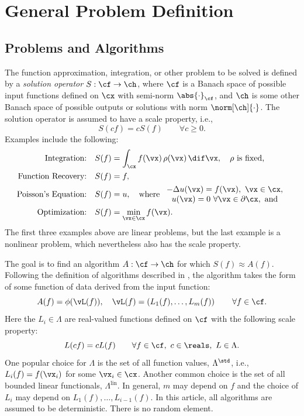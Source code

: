 \documentclass[]{elsarticle}
\DeclareMathOperator{\lin}{lin}
\theoremstyle{definition}
\theoremstyle{remark}
\newcommand{\Fnorm}[1]{\abs{#1}_{\cf}}
\begin{document}
\section{General Problem Definition} \label{probdefsec}

\subsection{Problems and Algorithms} The function approximation, integration, or other problem to be solved is defined by a \emph{solution operator} $S:\cf \to \ch$, where $\cf$ is a Banach space of possible input functions defined on $\cx$ with semi-norm $\Fnorm{\cdot}$, and $\ch$ is some other Banach space of possible outputs or solutions with norm $\norm[\ch]{\cdot}$. The solution operator is assumed to have a scale property, i.e., 
\[
S(cf) = cS(f) \qquad \forall c\ge 0.
\]
Examples include the following:
\begin{align*}
\text{Integration:} \quad & S(f) = \int_{\cx} f(\vx) \, \rho(\vx) \, \dif \vx, \quad \rho \text{ is fixed,}\\
\text{Function Recovery:} \quad & S(f) = f, \\
\text{Poisson's Equation:} \quad & S(f) = u, \quad \text{where } \begin{array}{c} -\Delta u(\vx) = f(\vx), \ \vx \in \cx, \\ u(\vx)=0 \ \forall \vx \in \partial \cx, \text{ and}\end{array} \\
\text{Optimization:} \quad & S(f) = \min_{\vx \in \cx} f(\vx).
\end{align*}
The first three examples above are linear problems, but the last example is a nonlinear problem, which nevertheless also has the scale property.

The goal is to find an algorithm $A:\cf \to \ch$ for which $S(f) \approx A(f)$. Following the definition of algorithms described in \cite[Section 3.2]{TraWasWoz88}, the algorithm takes the form of some function of data derived from the input function:
\begin{equation}
\label{algoform}
A(f) =  \phi(\vL(f)), \quad \vL(f) = \left(L_1(f), \ldots, L_m(f)\right) \qquad \forall f \in \cf.
\end{equation}
Here the $L_i \in \Lambda$ are real-valued functions defined on $\cf$ with the following scale property:
\begin{equation}
\label{dataassump}
L(cf) = cL(f) \qquad \forall f \in \cf, \ c \in \reals, \ L \in \Lambda.
\end{equation}
One popular choice for $\Lambda$ is the set of all function values, $\Lambda^{\std}$, i.e., $L_i(f) = f(\vx_i)$ for some $\vx_i \in \cx$.  Another common choice is the set of all bounded linear functionals, $\Lambda^{\lin}$.  In general, $m$ may depend on $f$ and the choice of $L_i$ may depend on $L_1(f), \ldots, L_{i-1}(f)$.  In this article, all algorithms are assumed to be deterministic.  There is no random element.
\end{document}
